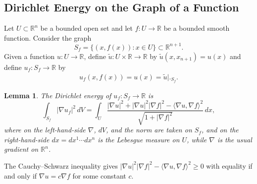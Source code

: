 \documentclass{CUP-JNL-FMP}%
\newtheorem{lemma}[theorem]{Lemma}
\theoremstyle{definition}
\numberwithin{equation}{section}
\begin{document}
\subsection{Dirichlet Energy on the Graph of a Function}
Let $U\subset\mathbb{R}^n$ be a bounded open set and let $f\colon U\rightarrow\mathbb{R}$ be a bounded smooth function. Consider the graph
$$S_f=\{(x,f(x)) : x\in U\}\subset\mathbb{R}^{n+1}.$$
Given a function $u\colon U\rightarrow\mathbb{R}$, define $\widetilde{u}\colon U\times\mathbb{R}\rightarrow\mathbb{R}$ by $\widetilde{u}(x,x_{n+1})=u(x)$ and define $u_f\colon S_f\rightarrow\mathbb{R}$ by
\begin{gather}\label{defuf}
  u_f(x,f(x)) = u(x)=\widetilde{u}\bigl|\bigr._{{S_f}}.
\end{gather}

\begin{lemma}\label{lemma:dirichletgraph}
	The Dirichlet energy of $u_f\colon S_f\rightarrow\mathbb{R}$ is
	\begin{equation}\label{eq:dirichletgraph}
	\int_{S_f} |\nabla u_f|^2\,dV
	= \int_U \frac{|\nabla u|^2 + |\nabla u|^2 |\nabla f|^2
	-\langle {\nabla u}, {\nabla f} \rangle^2}{\sqrt{1 + |\nabla f|^2}}
	\,dx,
	\end{equation}
	where on the left-hand-side $\nabla$, $dV$, and the norm are taken on $S_f$, and on the right-hand-side $dx=dx^1\cdots dx^n$ is the Lebesgue measure on $U$, while $\nabla$ is the usual gradient on $\mathbb{R}^n$.
\end{lemma}

	The Cauchy--Schwarz inequality gives $|\nabla u|^2 |\nabla f|^2
- \langle {\nabla u}, {\nabla f} \rangle^2 \geq 0$ with equality if and only
if $\nabla u = c \nabla f$ for some constant $c$.
\end{document}
